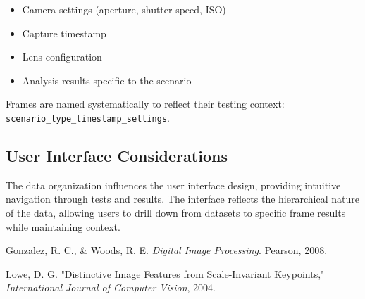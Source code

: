 \begin{itemize}
    \item Camera settings (aperture, shutter speed, ISO)
    \item Capture timestamp
    \item Lens configuration
    \item Analysis results specific to the scenario
\end{itemize}

Frames are named systematically to reflect their testing context: \texttt{scenario\_type\_timestamp\_settings}.

\subsection{User Interface Considerations}
The data organization influences the user interface design, providing intuitive navigation through tests and results. The interface reflects the hierarchical nature of the data, allowing users to drill down from datasets to specific frame results while maintaining context.


\begin{thebibliography}{9}

    Gonzalez, R. C., \& Woods, R. E. \textit{Digital Image Processing}. Pearson, 2008.
    
    Lowe, D. G. "Distinctive Image Features from Scale-Invariant Keypoints," \textit{International Journal of Computer Vision}, 2004.
    
    \end{thebibliography}